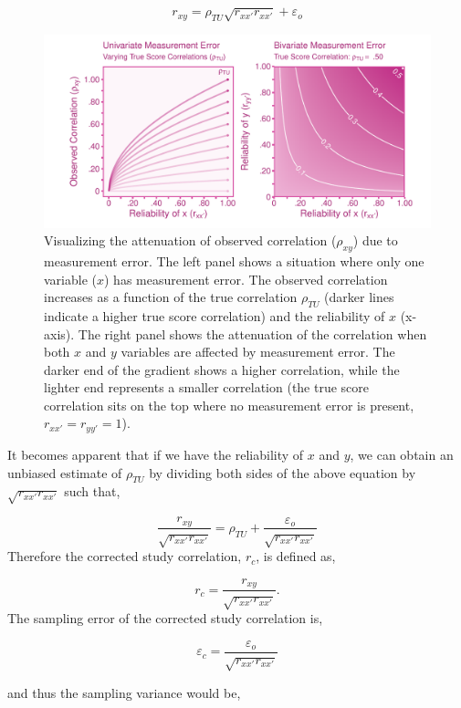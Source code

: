 \documentclass[
  letterpaper,
  DIV=11,
  numbers=noendperiod]{scrreprt}
\begin{document}
\[
r_{xy} = \rho_{TU}\sqrt{r_{xx'}r_{xx'}} + \varepsilon_o
\]

\begin{figure}

{\centering \includegraphics{unreliability_files/figure-pdf/unnamed-chunk-10-1.pdf}

}

\caption{Visualizing the attenuation of observed correlation
(\(\rho_{xy}\)) due to measurement error. The left panel shows a
situation where only one variable (\(x\)) has measurement error. The
observed correlation increases as a function of the true correlation
\(\rho_{TU}\) (darker lines indicate a higher true score correlation)
and the reliability of \(x\) (x-axis). The right panel shows the
attenuation of the correlation when both \(x\) and \(y\) variables are
affected by measurement error. The darker end of the gradient shows a
higher correlation, while the lighter end represents a smaller
correlation (the true score correlation sits on the top where no
measurement error is present, \(r_{xx'}=r_{yy'}=1\)).}

\end{figure}

It becomes apparent that if we have the reliability of \(x\) and \(y\),
we can obtain an unbiased estimate of \(\rho_{TU}\) by dividing both
sides of the above equation by \(\sqrt{r_{xx'}r_{xx'}}\) such that,

\[
\frac{r_{xy}}{\sqrt{r_{xx'}r_{xx'}}} =\rho_{TU} + \frac{\varepsilon_o}{\sqrt{r_{xx'}r_{xx'}}}
\] Therefore the corrected study correlation, \(r_c\), is defined as,

\[
r_c = \frac{r_{xy}}{\sqrt{r_{xx'}r_{xx'}}}.
\] The sampling error of the corrected study correlation is,

\[
\varepsilon_c = \frac{\varepsilon_{o}}{\sqrt{r_{xx'}r_{xx'}}}
\]

and thus the sampling variance would be,
\end{document}
